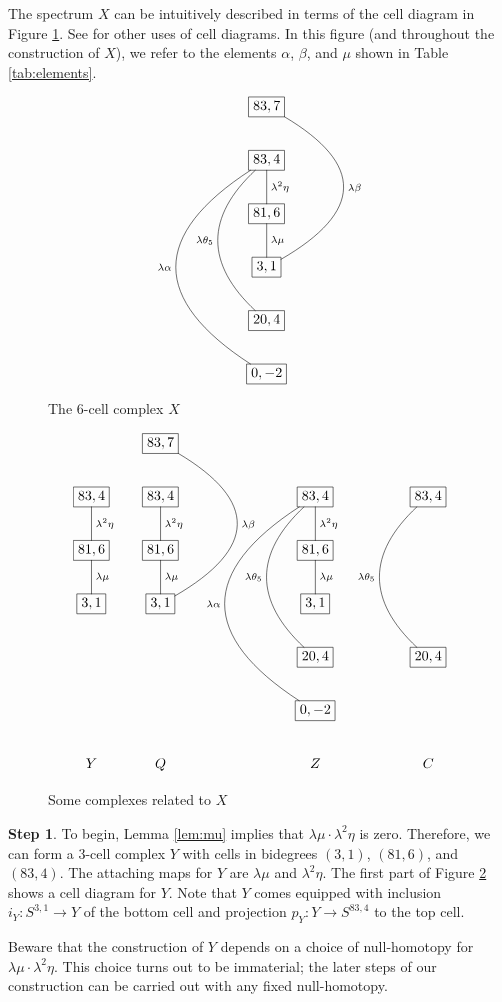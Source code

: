 \documentclass{amsart}
\theoremstyle{definition}
\newtheorem{step}[thm]{Step}
\newcommand{\map}{\rightarrow}
\newcommand{\Xtwofour}{Y}
\newcommand{\Xtwofive}{Q}
\newcommand{\Xonefour}{C}
\newcommand{\Xzerofour}{Z}
\begin{document}
The spectrum $X$ can be intuitively described in terms of the
cell diagram in Figure \ref{fig:X}. 
See \cite{BJM} \cite{HLSX} \cite{WX17} for other uses of cell diagrams.
In this figure (and throughout the construction of $X$),
we refer to the elements $\alpha$, $\beta$, and $\mu$
shown in Table \ref{tab:elements}.

\begin{figure}[h!]
\caption{The $6$-cell complex $X$ \label{fig:X}}
$$\xymatrix{
*+[F]{83, 7}  \ar@{-}@/_-55pt/[ddd]^-{\lambda \beta} \\
*+[F]{83, 4} \ar@{-}[d]^-{\lambda^2 \eta} \ar@{-}@/^-35pt/[ddd]_-{\lambda \theta_5} \ar@{-}@/^-65pt/[dddd]_-{\lambda \alpha} \\
*+[F]{81, 6} \ar@{-}[d]^-{\lambda \mu} \\
*+[F]{3, 1} \\
*+[F]{20, 4} \\
*+[F]{0,- 2}
}$$
\end{figure}



\begin{figure}[h!]
\caption{Some complexes related to $X$ \label{fig:subcomplexes}}
$$\xymatrix{
& *+[F]{83, 7}  \ar@{-}@/_-55pt/[ddd]^-{\lambda \beta} && && \\
*+[F]{83, 4} \ar@{-}[d]^-{\lambda^2 \eta} & *+[F]{83, 4} \ar@{-}[d]^-{\lambda^2 \eta} & && *+[F]{83, 4} \ar@{-}[d]^-{\lambda^2 \eta} \ar@{-}@/^-35pt/[ddd]_-{\lambda \theta_5} \ar@{-}@/^-65pt/[dddd]_-{\lambda \alpha}   && *+[F]{83, 4} \ar@{-}@/^-35pt/[ddd]_-{\lambda \theta_5} \\
*+[F]{81, 6} \ar@{-}[d]^-{\lambda \mu} & *+[F]{81, 6} \ar@{-}[d]^-{\lambda \mu} & && *+[F]{81, 6} \ar@{-}[d]^-{\lambda \mu} \\
*+[F]{3, 1} & *+[F]{3, 1} & && *+[F]{3, 1} \\
& & && *+[F]{20, 4} && *+[F]{20, 4}  \\
& &     && *+[F]{0, -2}  \\
 \Xtwofour & \Xtwofive & && \Xzerofour && \Xonefour
}$$
\end{figure}

\begin{step}
\label{step:X[2,4]}
To begin, Lemma \ref{lem:mu} implies that
$\lambda \mu \cdot \lambda^2 \eta$ is zero.
Therefore, we can 
form a 3-cell complex $\Xtwofour$ with cells in bidegrees 
$(3, 1)$, $(81, 6)$, and $(83, 4)$.
The attaching maps for $\Xtwofour$ are
$\lambda \mu$ and $\lambda^2 \eta$.
The first part of Figure \ref{fig:subcomplexes} shows
a cell diagram for $\Xtwofour$.
Note that $\Xtwofour$ comes equipped with 
inclusion $i_\Xtwofour: S^{3,1} \map \Xtwofour$ of the bottom cell
and projection
$p_\Xtwofour: \Xtwofour \map S^{83,4}$ to the top cell.

Beware that the construction of $\Xtwofour$ depends on a choice
of null-homotopy for $\lambda \mu \cdot \lambda^2 \eta$.
This choice turns out to be immaterial; the later steps of our
construction can be carried out with any fixed null-homotopy.
\end{step}
\end{document}
